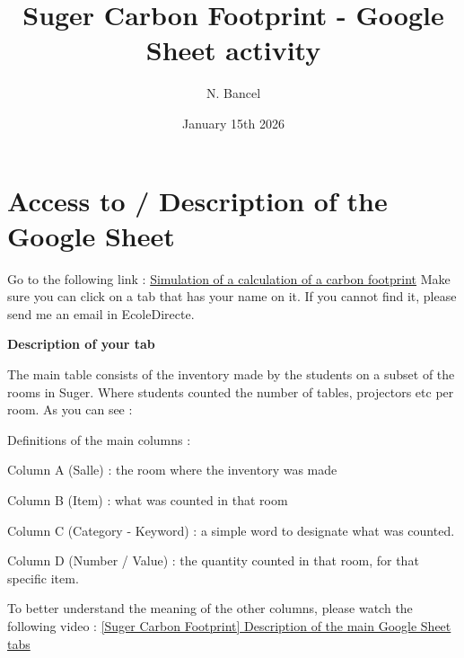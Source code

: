 \documentclass{exam}
\title{Suger Carbon Footprint - Google Sheet activity}
\author{N. Bancel}
\date{January 15th 2026}
\begin{document}
{\let\newpage\relax\maketitle}

\section{Access to / Description of the Google Sheet}

\begin{questions}
\question Go to the following link : \href{https://docs.google.com/spreadsheets/d/1dNwbzpJt8uUCMYMr-9A3AGU0R27vBdNBqc6oD62n8s8/edit?gid=2097997664#gid=2097997664}{Simulation of a calculation of a carbon footprint}
\question Make sure you can click on a tab that has your name on it. If you cannot find it, please send me an email in EcoleDirecte.
\end{questions}

\begin{Indication}
  \textbf{Description of your tab}
  \begin{compactitem}
    \item The main table consists of the inventory made by the students on a subset of the rooms in Suger. Where students counted the number of tables, projectors etc per room. As you can see : 
    \item Definitions of the main columns : 
    \begin{compactitem}
        \item Column A (Salle) : the room where the inventory was made 
        \item Column B (Item) : what was counted in that room
        \item Column C (Category - Keyword) : a simple word to designate what was counted. 
        \item Column D (Number / Value) : the quantity counted in that room, for that specific item.
    \end{compactitem}
    \item To better understand the meaning of the other columns, please watch the following video : \href{https://www.loom.com/share/01b4986befa84a109330f6ea4e52b666}{[Suger Carbon Footprint] Description of the main Google Sheet tabs}
  \end{compactitem}
\end{Indication}
\end{document}
